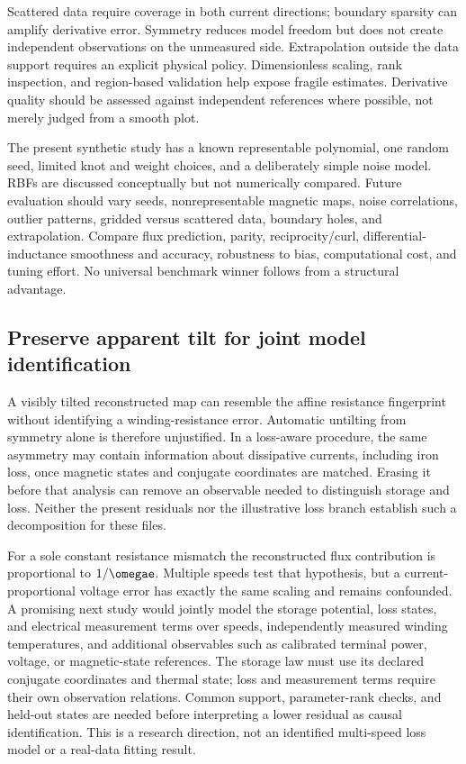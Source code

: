 Scattered data require coverage in both current directions; boundary sparsity
can amplify derivative error. Symmetry reduces model freedom but does not
create independent observations on the unmeasured side. Extrapolation outside
the data support requires an explicit physical policy. Dimensionless scaling,
rank inspection, and region-based validation help expose fragile estimates.
Derivative quality should be assessed against independent references where
possible, not merely judged from a smooth plot.

The present synthetic study has a known representable polynomial, one random
seed, limited knot and weight choices, and a deliberately simple noise model.
RBFs are discussed conceptually but not numerically compared. Future evaluation
should vary seeds, nonrepresentable magnetic maps, noise correlations, outlier
patterns, gridded versus scattered data, boundary holes, and extrapolation.
Compare flux prediction, parity, reciprocity/curl, differential-inductance
smoothness and accuracy, robustness to bias, computational cost, and tuning
effort. No universal benchmark winner follows from a structural advantage.

\subsection{Preserve apparent tilt for joint model identification}
A visibly tilted reconstructed map can resemble the affine resistance
fingerprint without identifying a winding-resistance error. Automatic
untilting from symmetry alone is therefore unjustified. In a loss-aware
procedure, the same asymmetry may contain information about dissipative
currents, including iron loss, once magnetic states and conjugate coordinates
are matched. Erasing it before that analysis can remove an observable needed
to distinguish storage and loss. Neither the present residuals nor the
illustrative loss branch establish such a decomposition for these files.

For a sole constant resistance mismatch the reconstructed flux contribution
is proportional to $1/\omegae$. Multiple speeds test that hypothesis, but a
current-proportional voltage error has exactly the same scaling and remains
confounded. A promising next study would jointly model the storage potential,
loss states, and electrical measurement terms over speeds, independently
measured winding temperatures, and additional observables such as calibrated
terminal power, voltage, or magnetic-state references. The storage law must
use its declared conjugate coordinates and thermal state; loss and measurement
terms require their own observation relations. Common support, parameter-rank
checks, and held-out states are needed before interpreting a lower residual
as causal identification. This is a research direction, not an identified
multi-speed loss model or a real-data fitting result.
